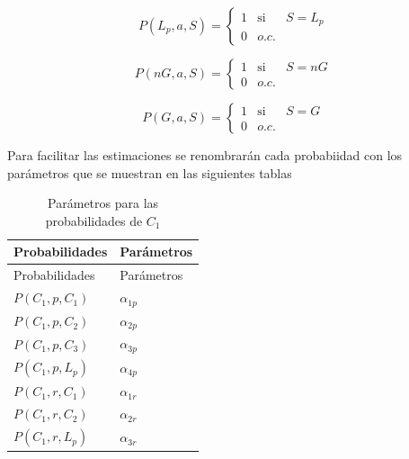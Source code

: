 \documentclass[
  us-letterpaper,
  DIV=11,
  numbers=noendperiod]{scrreprt}
\begin{document}
\[
    P(L_p,a,S)=\left\{\begin{array}{ccc}
            1 & \text{si} & S = L_p\\
            0 & o.c. &
            \end{array}\right. 
\]

\[
    P(nG,a,S)=\left\{\begin{array}{ccc}
            1 & \text{si} & S = nG\\
            0 & o.c. &
            \end{array}\right. 
\]

\[
    P(G,a,S)=\left\{\begin{array}{ccc}
            1 & \text{si} & S = G\\
            0 & o.c. &
            \end{array}\right. 
\]

Para facilitar las estimaciones se renombrarán cada probabiidad con los
parámetros que se muestran en las siguientes tablas

\begin{longtable}[]{@{}ll@{}}
\caption{Parámetros para las probabilidades de \(C_1\)}\tabularnewline
\toprule\noalign{}
Probabilidades & Parámetros \\
\midrule\noalign{}
\endfirsthead
\toprule\noalign{}
Probabilidades & Parámetros \\
\midrule\noalign{}
\endhead
\bottomrule\noalign{}
\endlastfoot
\(P(C_1,p,C_1)\) & \(\alpha_{1p}\) \\
\(P(C_1,p,C_2)\) & \(\alpha_{2p}\) \\
\(P(C_1,p,C_3)\) & \(\alpha_{3p}\) \\
\(P(C_1,p,L_p)\) & \(\alpha_{4p}\) \\
\(P(C_1,r,C_1)\) & \(\alpha_{1r}\) \\
\(P(C_1,r,C_2)\) & \(\alpha_{2r}\) \\
\(P(C_1,r,L_p)\) & \(\alpha_{3r}\) \\
\end{longtable}
\end{document}
